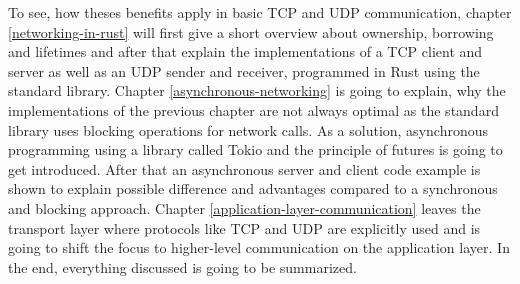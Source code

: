 To see, how theses benefits apply in basic TCP and UDP communication, chapter \ref{networking-in-rust} will first give a
short overview about ownership, borrowing and lifetimes and after that explain the implementations of a TCP client and
server as well as an UDP sender and receiver, programmed in Rust using the standard library. Chapter
\ref{asynchronous-networking} is going to explain, why the implementations of the previous chapter are not always
optimal as the standard library uses blocking operations for network calls. As a solution, asynchronous programming
using a library called Tokio and the principle of futures is going to get introduced. After that an asynchronous
server and client code example is shown to explain possible difference and advantages compared to a synchronous and
blocking approach. Chapter \ref{application-layer-communication} leaves the transport layer where protocols like TCP
and UDP are explicitly used and is going to shift the focus to higher-level communication on the application layer. In
the end, everything discussed is going to be summarized.

